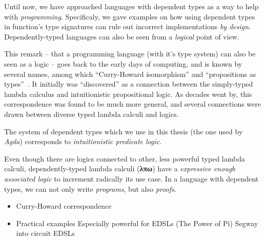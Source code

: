             Until now, we have approached languages with dependent types as a way to help with \emph{programming}.
            Specificaly, we gave examples on how using dependent types in function's type signatures
            can rule out incorrect implementations \emph{by design}.
            Dependently-typed languages can also be seen from a \emph{logical} point of view.

            This remark -- that a programming language (with it's type system) can also be seen as a logic --
            goes back to the early days of computing, and is known by several names,
            among which ``Curry-Howard isomorphism'' and ``propositions as types''~\cite{propositions-as-types}.
            It initially was ``discovered'' as a connection between the simply-typed lambda calculus
            and intuitionistic propositional logic.
            As decades went by, this correspondence was found to be much more general,
            and several connections were drawn between diverse typed lambda calculi and logics.

            The system of dependent types which we use in this thesis (the one used by \emph{Agda})
            corresponds to \emph{intuitionistic predicate logic}.


            Even though there are logics connected to other, less powerful typed lambda calculi,
            dependently-typed lambda calculi (\textbf{λπω}) have a
            \emph{expressive enough associated logic} to increment radically its use case.
            In a language with dependent types, we can not only write \emph{programs}, but also \emph{proofs}.


            \begin{itemize}
                \item Curry-Howard correspondence
                \item Practical examples
                    \subitem Especially powerful for EDSLs (The Power of Pi)
                    \subitem Segway into circuit EDSLs
            \end{itemize}



